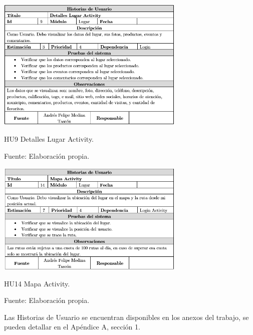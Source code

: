 \documentclass[12pt,letterpaper,openany]{book}
\begin{document}
\begin{table}[H]
\centering
\includegraphics[width=9cm]{./imagenes/HU/HU9}
\caption{HU9 Detalles Lugar Activity.}
\centering Fuente: Elaboración propia.
\end{table}

\begin{table}[H]
\centering
\includegraphics[width=9cm]{./imagenes/HU/HU14}
\caption{HU14 Mapa Activity.}
\centering Fuente: Elaboración propia.
\end{table}

Las Historias de Usuario se encuentran disponibles en los anexos del trabajo, se pueden detallar en el Apéndice A, sección 1.
\end{document}
